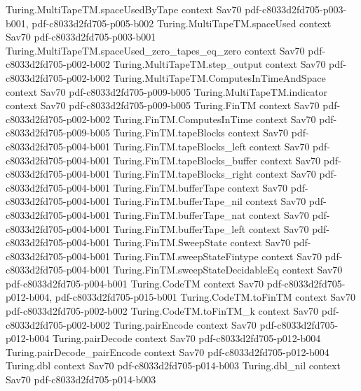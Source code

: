\begin{theorem}
\proofstep
  {Turing.MultiTapeTM.spaceUsedByTape}
  {context}
  {Sav70}
  {pdf-c8033d2fd705-p003-b001,
    pdf-c8033d2fd705-p005-b002}
\proofstep
  {Turing.MultiTapeTM.spaceUsed}
  {context}
  {Sav70}
  {pdf-c8033d2fd705-p003-b001}
\proofstep
  {Turing.MultiTapeTM.spaceUsed_zero_tapes_eq_zero}
  {context}
  {Sav70}
  {pdf-c8033d2fd705-p002-b002}
\proofstep
  {Turing.MultiTapeTM.step_output}
  {context}
  {Sav70}
  {pdf-c8033d2fd705-p002-b002}
\proofstep
  {Turing.MultiTapeTM.ComputesInTimeAndSpace}
  {context}
  {Sav70}
  {pdf-c8033d2fd705-p009-b005}
\proofstep
  {Turing.MultiTapeTM.indicator}
  {context}
  {Sav70}
  {pdf-c8033d2fd705-p009-b005}
\proofstep
  {Turing.FinTM}
  {context}
  {Sav70}
  {pdf-c8033d2fd705-p002-b002}
\proofstep
  {Turing.FinTM.ComputesInTime}
  {context}
  {Sav70}
  {pdf-c8033d2fd705-p009-b005}
\proofstep
  {Turing.FinTM.tapeBlocks}
  {context}
  {Sav70}
  {pdf-c8033d2fd705-p004-b001}
\proofstep
  {Turing.FinTM.tapeBlocks_left}
  {context}
  {Sav70}
  {pdf-c8033d2fd705-p004-b001}
\proofstep
  {Turing.FinTM.tapeBlocks_buffer}
  {context}
  {Sav70}
  {pdf-c8033d2fd705-p004-b001}
\proofstep
  {Turing.FinTM.tapeBlocks_right}
  {context}
  {Sav70}
  {pdf-c8033d2fd705-p004-b001}
\proofstep
  {Turing.FinTM.bufferTape}
  {context}
  {Sav70}
  {pdf-c8033d2fd705-p004-b001}
\proofstep
  {Turing.FinTM.bufferTape_nil}
  {context}
  {Sav70}
  {pdf-c8033d2fd705-p004-b001}
\proofstep
  {Turing.FinTM.bufferTape_nat}
  {context}
  {Sav70}
  {pdf-c8033d2fd705-p004-b001}
\proofstep
  {Turing.FinTM.bufferTape_left}
  {context}
  {Sav70}
  {pdf-c8033d2fd705-p004-b001}
\proofstep
  {Turing.FinTM.SweepState}
  {context}
  {Sav70}
  {pdf-c8033d2fd705-p004-b001}
\proofstep
  {Turing.FinTM.sweepStateFintype}
  {context}
  {Sav70}
  {pdf-c8033d2fd705-p004-b001}
\proofstep
  {Turing.FinTM.sweepStateDecidableEq}
  {context}
  {Sav70}
  {pdf-c8033d2fd705-p004-b001}
\proofstep
  {Turing.CodeTM}
  {context}
  {Sav70}
  {pdf-c8033d2fd705-p012-b004,
    pdf-c8033d2fd705-p015-b001}
\proofstep
  {Turing.CodeTM.toFinTM}
  {context}
  {Sav70}
  {pdf-c8033d2fd705-p002-b002}
\proofstep
  {Turing.CodeTM.toFinTM_k}
  {context}
  {Sav70}
  {pdf-c8033d2fd705-p002-b002}
\proofstep
  {Turing.pairEncode}
  {context}
  {Sav70}
  {pdf-c8033d2fd705-p012-b004}
\proofstep
  {Turing.pairDecode}
  {context}
  {Sav70}
  {pdf-c8033d2fd705-p012-b004}
\proofstep
  {Turing.pairDecode_pairEncode}
  {context}
  {Sav70}
  {pdf-c8033d2fd705-p012-b004}
\proofstep
  {Turing.dbl}
  {context}
  {Sav70}
  {pdf-c8033d2fd705-p014-b003}
\proofstep
  {Turing.dbl_nil}
  {context}
  {Sav70}
  {pdf-c8033d2fd705-p014-b003}

\end{theorem}
